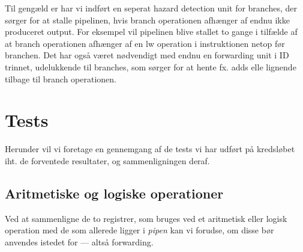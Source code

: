 \documentclass[11pt,twoside,a4paper]{article}
\begin{document}
Til gengæld er har vi indført en seperat hazard detection unit for branches,
der sørger for at stalle pipelinen, hvis branch operationen afhænger af endnu
ikke produceret output. For eksempel vil pipelinen blive stallet to gange i
tilfælde af at branch operationen afhænger af en lw operation i instruktionen
netop før branchen. Det har også været nødvendigt med endnu en forwarding
unit i ID trinnet, udelukkende til branches, som sørger for at hente fx. adds
elle lignende tilbage til branch operationen.

\newpage
\pagestyle{fancy}
\section{Tests}
Herunder vil vi foretage en gennemgang af de tests vi har udført på
kredsløbet iht. de forventede resultater, og sammenligningen deraf.

\subsection{Aritmetiske og logiske operationer}
Ved at sammenligne de to registrer, som bruges ved et aritmetisk eller logisk
operation med de som allerede ligger i {\it pipen} kan vi forudse, om disse
bør anvendes istedet for --- altså forwarding.
\end{document}

